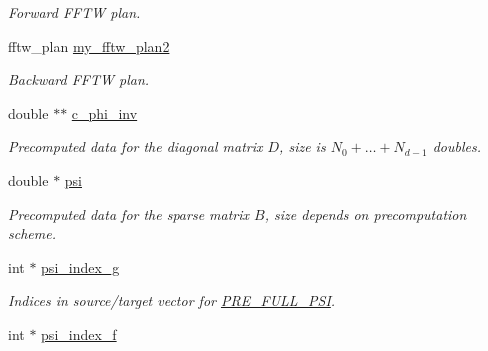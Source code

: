 \begin{CompactItemize}
\begin{CompactList}\small\item\em Forward FFTW plan. \item\end{CompactList}\item 
\hypertarget{structnfft__plan_228dee0f91c2f326407517c27bc5105e}{
fftw\_\-plan \hyperlink{structnfft__plan_228dee0f91c2f326407517c27bc5105e}{my\_\-fftw\_\-plan2}}
\label{structnfft__plan_228dee0f91c2f326407517c27bc5105e}

\begin{CompactList}\small\item\em Backward FFTW plan. \item\end{CompactList}\item 
\hypertarget{structnfft__plan_a5dd76324152be95967c0a4717e8e4ce}{
double $\ast$$\ast$ \hyperlink{structnfft__plan_a5dd76324152be95967c0a4717e8e4ce}{c\_\-phi\_\-inv}}
\label{structnfft__plan_a5dd76324152be95967c0a4717e8e4ce}

\begin{CompactList}\small\item\em Precomputed data for the diagonal matrix $D$, size is $N_0+\hdots+N_{d-1}$ doubles. \item\end{CompactList}\item 
\hypertarget{structnfft__plan_0330a1c3ae461fa9156ba0ecbe17bb7c}{
double $\ast$ \hyperlink{structnfft__plan_0330a1c3ae461fa9156ba0ecbe17bb7c}{psi}}
\label{structnfft__plan_0330a1c3ae461fa9156ba0ecbe17bb7c}

\begin{CompactList}\small\item\em Precomputed data for the sparse matrix $B$, size depends on precomputation scheme. \item\end{CompactList}\item 
\hypertarget{structnfft__plan_877d6cbe17ec77a9e66bdbea3cfafe0a}{
int $\ast$ \hyperlink{structnfft__plan_877d6cbe17ec77a9e66bdbea3cfafe0a}{psi\_\-index\_\-g}}
\label{structnfft__plan_877d6cbe17ec77a9e66bdbea3cfafe0a}

\begin{CompactList}\small\item\em Indices in source/target vector for \hyperlink{group__nfft_g7ad8a7e19519b16340dabec48899c6a4}{PRE\_\-FULL\_\-PSI}. \item\end{CompactList}\item 
\hypertarget{structnfft__plan_2ed144cf7d6043a93c07b6f6ba7bbe2a}{
int $\ast$ \hyperlink{structnfft__plan_2ed144cf7d6043a93c07b6f6ba7bbe2a}{psi\_\-index\_\-f}}
\label{structnfft__plan_2ed144cf7d6043a93c07b6f6ba7bbe2a}


\end{CompactItemize}
